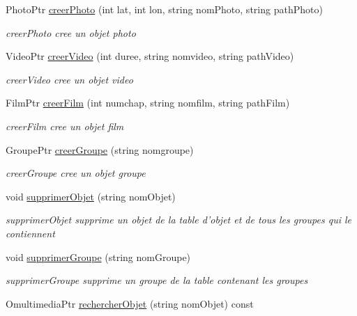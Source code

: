 \begin{DoxyCompactItemize}
\item 
Photo\+Ptr \hyperlink{class_fabriquer_a43ca6503ecd78c032d39646e4aaf34a2}{creer\+Photo} (int lat, int lon, string nom\+Photo, string path\+Photo)
\begin{DoxyCompactList}\small\item\em creer\+Photo cree un objet photo \end{DoxyCompactList}\item 
Video\+Ptr \hyperlink{class_fabriquer_afbc9a780e605919e401c68de68b321c9}{creer\+Video} (int duree, string nomvideo, string path\+Video)
\begin{DoxyCompactList}\small\item\em creer\+Video cree un objet video \end{DoxyCompactList}\item 
Film\+Ptr \hyperlink{class_fabriquer_a6051c8212fd9c103367a5dd1daa85497}{creer\+Film} (int numchap, string nomfilm, string path\+Film)
\begin{DoxyCompactList}\small\item\em creer\+Film cree un objet film \end{DoxyCompactList}\item 
Groupe\+Ptr \hyperlink{class_fabriquer_ae2aa5d0a9600f0b2613138fa80e9eb82}{creer\+Groupe} (string nomgroupe)
\begin{DoxyCompactList}\small\item\em creer\+Groupe cree un objet groupe \end{DoxyCompactList}\item 
void \hyperlink{class_fabriquer_a348f308764daf0552ad2fe20c213ba72}{supprimer\+Objet} (string nom\+Objet)
\begin{DoxyCompactList}\small\item\em supprimer\+Objet supprime un objet de la table d'objet et de tous les groupes qui le contiennent \end{DoxyCompactList}\item 
void \hyperlink{class_fabriquer_a6b079553cd4d8ca1b8ac4a209630eff8}{supprimer\+Groupe} (string nom\+Groupe)
\begin{DoxyCompactList}\small\item\em supprimer\+Groupe supprime un groupe de la table contenant les groupes \end{DoxyCompactList}\item 
Omultimedia\+Ptr \hyperlink{class_fabriquer_a1ddcb6f722edfbc0695933bcc4aba54c}{rechercher\+Objet} (string nom\+Objet) const 

\end{DoxyCompactItemize}
